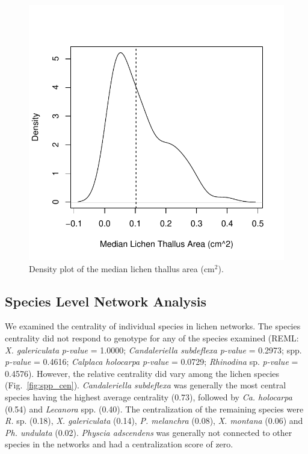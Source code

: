 \documentclass[11pt,onecolumn,lineno]{pnas-new}
\begin{document}
\begin{figure}[ht]
\centering
\includegraphics[width=\linewidth]{supplement/xg_size.pdf}
\caption{Density plot of the median lichen thallus area (cm$^2$). }
\label{fig:SI_xg_median}
\end{figure}




\subsection{Species Level Network Analysis}


We examined the centrality of individual species in lichen
networks. The species centrality did not respond to genotype for any
of the species examined (REML: \textit{X. galericulata}
\textit{p-value} = 1.0000; \textit{Candaleriella subdeflexa}
\textit{p-value} = 0.2973;  spp. \textit{p-value} =
0.4616; \textit{Calplaca holocarpa} \textit{p-value} = 0.0729;
\textit{Rhinodina} sp. \textit{p-value} = 0.4576). However, the
relative centrality did vary among the lichen species
(Fig.~\ref{fig:spp_cen}). \textit{Candaleriella subdeflexa} was
generally the most central species having the highest average
centrality (0.73), followed by \textit{Ca. holocarpa} (0.54) and
\textit{Lecanora} spp. (0.40). The centralization of the remaining
species were \textit{R.}  sp. (0.18), \textit{X. galericulata} (0.14),
\textit{P. melanchra} (0.08), \textit{X. montana} (0.06) and
\textit{Ph. undulata} (0.02). \textit{Physcia adscendens} was
generally not connected to other species in the networks and had a
centralization score of zero.
\end{document}
